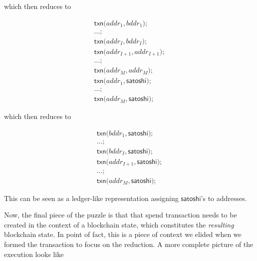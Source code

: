 \documentclass[]{acm_proc_article-sp}
\numberwithin{equation}{subsection}
\begin{document}
which then reduces to

\begin{equation*}
  \begin{aligned} 
  \mathsf{txn}\mathsf{(} addr_1, bddr_1 \mathsf{)} \mathsf{;}\\
  \ldots \mathsf{;} \\
  \mathsf{txn}\mathsf{(} addr_I, bddr_I \mathsf{)} \mathsf{;} \\
  \mathsf{txn}\mathsf{(} addr_{I+1}, addr_{I+1} \mathsf{)} \mathsf{;} \\
  \ldots \mathsf{;} \\
  \mathsf{txn}\mathsf{(} addr_M, addr_M \mathsf{)} \mathsf{;} \\
  \mathsf{txn}\mathsf{(} addr_1, \mathsf{satoshi} \mathsf{)} \mathsf{;} \\
  \ldots \mathsf{;} \\
  \mathsf{txn}\mathsf{(} addr_M, \mathsf{satoshi} \mathsf{)} \mathsf{;}
  \end{aligned} 
\end{equation*}

which then reduces to

\begin{equation*}
  \begin{aligned} 
    \mathsf{txn}\mathsf{(} bddr_1, \mathsf{satoshi} \mathsf{)} \mathsf{;}\\
    \ldots \mathsf{;} \\
    \mathsf{txn}\mathsf{(} bddr_I, \mathsf{satoshi} \mathsf{)} \mathsf{;} \\
    \mathsf{txn}\mathsf{(} addr_{I+1}, \mathsf{satoshi} \mathsf{)} \mathsf{;} \\
    \ldots \mathsf{;} \\
    \mathsf{txn}\mathsf{(} addr_M, \mathsf{satoshi} \mathsf{)} \mathsf{;}
  \end{aligned} 
\end{equation*}

This can be seen as a ledger-like representation assigning
$\mathsf{satoshi}$'s to addresses.

Now, the final piece of the puzzle is that that spend transaction
needs to be created in the context of a blockchain state, which
constitutes the \emph{resulting} blockchain state. In point of fact,
this is a piece of context we elided when we formed the transaction to
focus on the reduction. A more complete picture of the execution looks like
\end{document}
